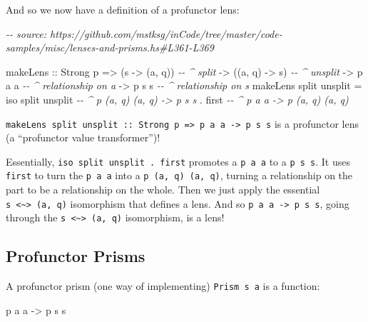 \documentclass[]{article}
\newenvironment{Shaded}{}{}
\newcommand{\CommentTok}[1]{\textcolor[rgb]{0.38,0.63,0.69}{\textit{#1}}}
\newcommand{\DataTypeTok}[1]{\textcolor[rgb]{0.56,0.13,0.00}{#1}}
\newcommand{\NormalTok}[1]{#1}
\newcommand{\OperatorTok}[1]{\textcolor[rgb]{0.40,0.40,0.40}{#1}}
\newcommand{\OtherTok}[1]{\textcolor[rgb]{0.00,0.44,0.13}{#1}}
\begin{document}
And so we now have a definition of a profunctor lens:

\begin{Shaded}
\begin{Highlighting}[]
\CommentTok{{-}{-} source: https://github.com/mstksg/inCode/tree/master/code{-}samples/misc/lenses{-}and{-}prisms.hs\#L361{-}L369}

\NormalTok{makeLens}
\OtherTok{    ::} \DataTypeTok{Strong}\NormalTok{ p}
    \OtherTok{=>}\NormalTok{ (s }\OtherTok{{-}>}\NormalTok{ (a, q))        }\CommentTok{{-}{-} \^{} split}
    \OtherTok{{-}>}\NormalTok{ ((a, q) }\OtherTok{{-}>}\NormalTok{ s)        }\CommentTok{{-}{-} \^{} unsplit}
    \OtherTok{{-}>}\NormalTok{ p a a                }\CommentTok{{-}{-} \^{} relationship on a}
    \OtherTok{{-}>}\NormalTok{ p s s                }\CommentTok{{-}{-} \^{} relationship on s}
\NormalTok{makeLens split unsplit }\OtherTok{=}
\NormalTok{    iso split unsplit  }\CommentTok{{-}{-} \^{} p (a, q) (a, q) {-}> p s s}
  \OperatorTok{.}\NormalTok{ first\textquotesingle{}             }\CommentTok{{-}{-} \^{} p a a {-}> p (a, q) (a, q)}
\end{Highlighting}
\end{Shaded}

\texttt{makeLens\ split\ unsplit\ ::\ Strong\ p\ =\textgreater{}\ p\ a\ a\ -\textgreater{}\ p\ s\ s}
is a profunctor lens (a ``profunctor value transformer'')!

Essentially, \texttt{iso\ split\ unsplit\ .\ first\textquotesingle{}} promotes a
\texttt{p\ a\ a} to a \texttt{p\ s\ s}. It uses \texttt{first\textquotesingle{}}
to turn the \texttt{p\ a\ a} into a \texttt{p\ (a,\ q)\ (a,\ q)}, turning a
relationship on the part to be a relationship on the whole. Then we just apply
the essential \texttt{s\ \textless{}\textasciitilde{}\textgreater{}\ (a,\ q)}
isomorphism that defines a lens. And so
\texttt{p\ a\ a\ -\textgreater{}\ p\ s\ s}, going through the
\texttt{s\ \textless{}\textasciitilde{}\textgreater{}\ (a,\ q)} isomorphism, is
a lens!

\hypertarget{profunctor-prisms}{%
\subsection{Profunctor Prisms}\label{profunctor-prisms}}

A profunctor prism (one way of implementing)
\texttt{Prism\textquotesingle{}\ s\ a} is a function:

\begin{Shaded}
\begin{Highlighting}[]
\NormalTok{p a a }\OtherTok{{-}>}\NormalTok{ p s s}
\end{Highlighting}
\end{Shaded}
\end{document}
